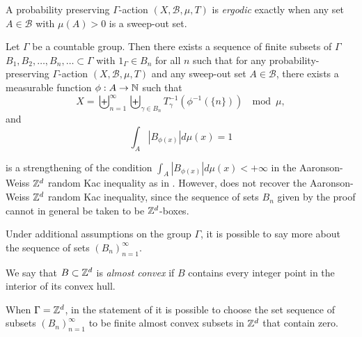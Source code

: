 \documentclass[12pt,reqno]{amsart}
\begin{document}
A probability preserving $\Gamma$-action   $(X,\mathcal{B},\mu,T)$ is  \emph{ergodic} exactly when any set $A \in \mathcal{B}$ with $\mu(A)>0$ is a sweep-out set.

\begin{thm}\label{thm:Kac_function_group_action}
Let $\Gamma$ be a countable group. Then there exists a sequence of finite subsets of $\Gamma$ $B_1,B_2,\ldots,B_n,\ldots \subset \Gamma$ with $1_\Gamma \in B_n$ for all $n$
such that for any   probability-preserving $\Gamma$-action $(X,\mathcal{B},\mu,T)$ and any  sweep-out set $A \in \mathcal{B}$,  there exists 
 a measurable function $\phi:A \to \mathbb{N}$ such that 
\begin{equation}\label{eq:X_partition}
 X = \biguplus_{n=1}^\infty \biguplus_{\gamma \in B_n}T_\gamma^{-1}(\phi^{-1}(\{n\})) ~\mod \mu,
\end{equation}
and
\begin{equation}\label{eq:int_Kac_function_is_1}
    \int_A |B_{\phi(x)}| d\mu(x) =1 
\end{equation}
\end{thm}

 is a strengthening of the condition $\int_A | B_{\phi(x)}| d\mu(x) < + \infty$  in the Aaronson-Weiss $\mathbb{Z}^d$ random Kac inequality as in \cite[Theorem 2.1]{MR1412593}. However,  does not recover the 
 Aaronson-Weiss $\mathbb{Z}^d$ random Kac inequality, since the sequence of sets $B_n$ given by the proof cannot in general be taken to be  $\mathbb{Z}^d$-boxes. 
 
Under additional assumptions on the group $\Gamma$, it is possible to say more about the sequence of sets $(B_n)_{n=1}^\infty$.

\begin{definition}
We say that  $B\subset\mathbb{Z}^d$ is \emph{almost convex} if $B$ contains every integer point in the interior of its convex hull.
\end{definition}


\begin{prop}\label{prop:Kac_Zd_convex}
 When $\Gamma= \mathbb{Z}^d$, in the statement of  it is possible to choose the set sequence of subsets $(B_n)_{n=1}^\infty$ to be finite almost convex subsets in $\mathbb{Z}^d$ that contain zero.
\end{prop}
\end{document}
